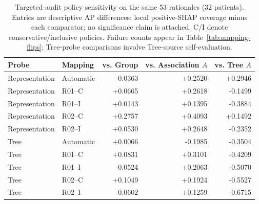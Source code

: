 \begin{table}[!tbp]\centering\scriptsize
\caption{Targeted-audit policy sensitivity on the same 53 rationales (32 patients). Entries are descriptive AP differences: local positive-SHAP coverage minus each comparator; no significance claim is attached. C/I denote conservative/inclusive policies. Failure counts appear in Table~\ref{tab:mapping-flips}; Tree-probe comparisons involve Tree-source self-evaluation.}\label{tab:targeted-policy-ap}
\begin{tabular}{llrrr}\toprule
Probe & Mapping & vs. Group & vs. Association $A$ & vs. Tree $A$ \\ \midrule
Representation & Automatic & -0.0363 & +0.2520 & +0.2946 \\
Representation & R01--C & +0.0665 & +0.2618 & -0.1499 \\
Representation & R01--I & +0.0143 & +0.1395 & -0.3884 \\
Representation & R02--C & +0.2757 & +0.4093 & +0.1492 \\
Representation & R02--I & +0.0530 & +0.2648 & -0.2352 \\
Tree & Automatic & +0.0066 & -0.1985 & -0.3504 \\
Tree & R01--C & +0.0831 & +0.3101 & -0.4209 \\
Tree & R01--I & -0.0524 & +0.2063 & -0.5070 \\
Tree & R02--C & +0.1049 & +0.1924 & -0.5527 \\
Tree & R02--I & -0.0602 & +0.1259 & -0.6715 \\
\bottomrule\end{tabular}\end{table}
